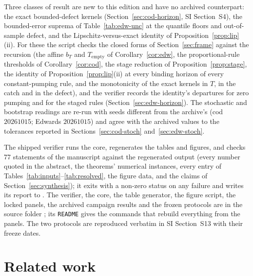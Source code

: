 \documentclass[11pt,a4paper]{article}
\theoremstyle{plain}
\theoremstyle{definition}
\theoremstyle{remark}
\newcommand{\Tempty}{T_{\mathrm{empty}}}
\newcommand{\nchecks}{77}
\begin{document}
Three classes of result are new to this edition and have no archived counterpart: the exact bounded-defect kernels (Section~\ref{sec:cod-horizon}, SI Section~S4), the bounded-error suprema of Table~\ref{tab:edw-unc} at the quantile floors and out-of-sample defect, and the Lipschitz-versus-exact identity of Proposition~\ref{prop:lip}(ii). For these the script checks the closed forms of Section~\ref{sec:frame} against the recursion (the affine $b_T$ and $\Tempty$ of Corollary~\ref{cor:edw}, the proportional-rule thresholds of Corollary~\ref{cor:cod}, the stage reduction of Proposition~\ref{prop:stage}, the identity of Proposition~\ref{prop:lip}(ii) at every binding horizon of every constant-pumping rule, and the monotonicity of the exact kernels in $T$, in the catch and in the defect), and the verifier records the identity's departures for zero pumping and for the staged rules (Section~\ref{sec:edw-horizon}). The stochastic and bootstrap readings are re-run with seeds different from the archive's (cod $20261015$; Edwards $20261015$) and agree with the archived values to the tolerances reported in Sections~\ref{sec:cod-stoch} and~\ref{sec:edw-stoch}.

The shipped verifier  runs the core, regenerates the tables and figures, and checks \nchecks{} statements of the manuscript against the regenerated output (every number quoted in the abstract, the theorems' numerical instances, every entry of Tables~\ref{tab:inputs}--\ref{tab:resolved}, the figure data, and the claims of Section~\ref{sec:synthesis}); it exits with a non-zero status on any failure and writes its report to . The verifier, the core, the table generator, the figure script, the locked panels, the archived campaign results and the frozen protocols are in the source folder ; its \texttt{README} gives the commands that rebuild everything from the panels. The two protocols are reproduced verbatim in SI Section~S13 with their freeze dates.

\section{Related work}\label{sec:related}
\end{document}
